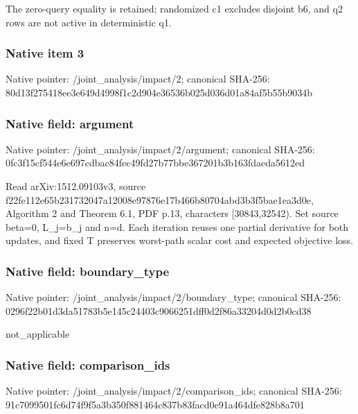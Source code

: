 \documentclass[10pt,a4paper]{article}
\begin{document}
\begingroup\raggedright\sloppy The zero-query equality is retained;\allowbreak{} randomized c1 excludes disjoint b6,\allowbreak{} and q2 rows are not active in deterministic q1.\par\endgroup

\subsubsection{Native item 3}
Native pointer: /joint\_\allowbreak{}analysis/impact/2; canonical SHA-256: 80d13f275418ee3e649d4998f1c2d904e36536b025d036d01a84af5b55b9034b

\subsubsection{Native field: argument}
Native pointer: /joint\_\allowbreak{}analysis/impact/2/argument; canonical SHA-256: 0fc3f15cf544e6e697cdbac84fec49fd27b77bbe367201b3b163fdaeda5612ed

\begingroup\raggedright\sloppy Read arXiv:\allowbreak{}1512.09103v3,\allowbreak{} source f22fe112e65b231732047a12008e97876e17b466b80704abd3b3f5bae1ea3d0e,\allowbreak{} Algorithm 2 and Theorem 6.1,\allowbreak{} PDF p.13,\allowbreak{} characters [30843,\allowbreak{}32542). Set source beta=\allowbreak{}0,\allowbreak{} L\_\allowbreak{}j=\allowbreak{}b\_\allowbreak{}j and n=\allowbreak{}d. Each iteration reuses one partial derivative for both updates,\allowbreak{} and fixed T preserves worst-path scalar cost and expected objective loss.\par\endgroup

\subsubsection{Native field: boundary\_\allowbreak{}type}
Native pointer: /joint\_\allowbreak{}analysis/impact/2/boundary\_\allowbreak{}type; canonical SHA-256: 0296f22b01d3da51783b5e145c24403c9066251dff0d2f86a33204d0d2b0cd38

\begingroup\raggedright\sloppy not\_\allowbreak{}applicable\par\endgroup

\subsubsection{Native field: comparison\_\allowbreak{}ids}
Native pointer: /joint\_\allowbreak{}analysis/impact/2/comparison\_\allowbreak{}ids; canonical SHA-256: 91c7099501fc6d74f9f5a3b350f881464c837b83facd0e91a464dfe828b8a701
\end{document}
